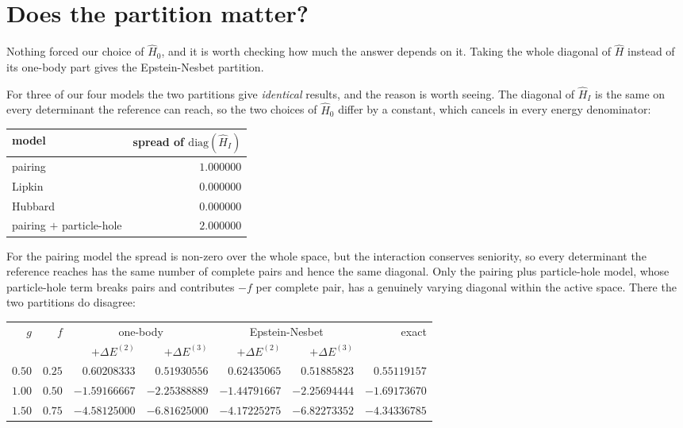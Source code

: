 \section{Does the partition matter?}
\label{sec:partitions}

Nothing forced our choice of $\hat{H}_0$, and it is worth checking how much
the answer depends on it.  Taking the whole diagonal of $\hat{H}$ instead of
its one-body part gives the Epstein-Nesbet partition.

For three of our four models the two partitions give \emph{identical} results,
and the reason is worth seeing.  The diagonal of $\hat{H}_I$ is the same on
every determinant the reference can reach, so the two choices of $\hat{H}_0$
differ by a constant, which cancels in every energy denominator:

\begin{center}
\renewcommand{\arraystretch}{1.2}
\setlength{\tabcolsep}{12pt}
\begin{tabular}{lr}
\toprule
model & spread of $\mathrm{diag}(\hat{H}_I)$\\
\midrule
pairing & $1.000000$\\
Lipkin & $0.000000$\\
Hubbard & $0.000000$\\
pairing $+$ particle-hole & $2.000000$\\
\bottomrule
\end{tabular}
\end{center}

For the pairing model the spread is non-zero over the whole space, but the
interaction conserves seniority, so every determinant the reference reaches
has the same number of complete pairs and hence the same diagonal.  Only the
pairing plus particle-hole model, whose particle-hole term breaks pairs and
contributes $-f$ per complete pair, has a genuinely varying diagonal within
the active space.  There the two partitions do disagree:

\begin{center}
\renewcommand{\arraystretch}{1.2}
\setlength{\tabcolsep}{7pt}
\begin{tabular}{rrrrrrr}
\toprule
$g$ & $f$ & \multicolumn{2}{c}{one-body}
  & \multicolumn{2}{c}{Epstein-Nesbet} & exact\\
 & & $+\Delta E^{(2)}$ & $+\Delta E^{(3)}$
  & $+\Delta E^{(2)}$ & $+\Delta E^{(3)}$ & \\
\midrule
$0.50$ & $0.25$ & $0.60208333$ & $0.51930556$ & $0.62435065$
  & $0.51885823$ & $0.55119157$\\
$1.00$ & $0.50$ & $-1.59166667$ & $-2.25388889$ & $-1.44791667$
  & $-2.25694444$ & $-1.69173670$\\
$1.50$ & $0.75$ & $-4.58125000$ & $-6.81625000$ & $-4.17225275$
  & $-6.82273352$ & $-4.34336785$\\
\bottomrule
\end{tabular}
\end{center}

